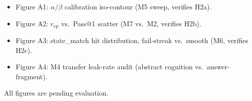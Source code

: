 \begin{itemize}[noitemsep,topsep=0pt]
    \item Figure A1: $\alpha/\beta$ calibration iso-contour (M5 sweep, verifies H2a).
    \item Figure A2: $r_{\text{cp}}$ vs.\ Pass@1 scatter (M7 vs.\ M2, verifies H2b).
    \item Figure A3: state\_match hit distribution, fail-streak vs.\ smooth (M6, verifies H2c).
    \item Figure A4: M4 transfer leak-rate audit (abstract cognition vs.\ answer-fragment).
\end{itemize}
All figures are \TBD{} pending evaluation.

